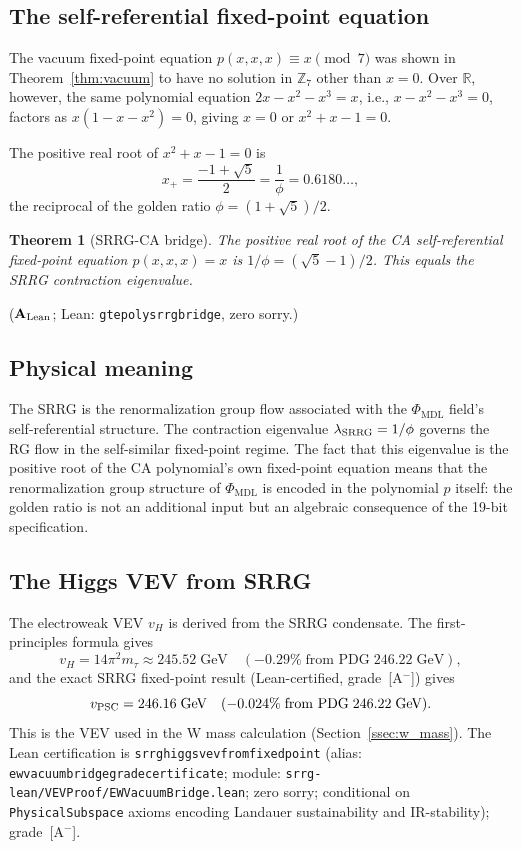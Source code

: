 \documentclass[11pt]{article}
\newtheorem{theorem}{Theorem}[section]
\theoremstyle{remark}
\newcommand{\PHIMDL}{\Phi_{\mathrm{MDL}}}
\newcommand{\ZS}{\mathbb{Z}_7}
\newcommand{\lean}[1]{%
  \penalty-100
  \begingroup\def\_{\textunderscore\allowbreak}\texttt{#1}\endgroup}
\newcommand{\CatAL}{\ensuremath{\textbf{A}_{\rm Lean}}}
\begin{document}
\subsection{The self-referential fixed-point equation}
\label{ssec:srrg_fp}

The vacuum fixed-point equation $p(x,x,x)\equiv x\pmod 7$ was shown in
Theorem~\ref{thm:vacuum} to have no solution in $\ZS$ other than $x=0$.
Over $\mathbb{R}$, however, the same polynomial equation
$2x - x^2 - x^3 = x$, i.e., $x - x^2 - x^3 = 0$, factors as
$x(1-x-x^2) = 0$, giving $x=0$ or $x^2+x-1=0$.

The positive real root of $x^2+x-1=0$ is
\[
  x_+ = \frac{-1+\sqrt{5}}{2} = \frac{1}{\phi} = 0.6180\ldots,
\]
the reciprocal of the golden ratio $\phi = (1+\sqrt{5})/2$.

\begin{theorem}[SRRG-CA bridge]
\label{thm:srrg}
The positive real root of the CA self-referential fixed-point equation
$p(x,x,x) = x$ is $1/\phi = (\sqrt{5}-1)/2$. This equals the SRRG contraction eigenvalue.
\end{theorem}

($\CatAL$; Lean: \lean{gte\_poly\_srrg\_bridge}, zero sorry.)

\subsection{Physical meaning}
\label{ssec:srrg_meaning}

The SRRG is the renormalization group flow associated with the $\PHIMDL$ field's
self-referential structure. The contraction eigenvalue $\lambda_{\rm SRRG} = 1/\phi$
governs the RG flow in the self-similar fixed-point regime. The fact that this
eigenvalue is the positive root of the CA polynomial's own fixed-point equation
means that the renormalization group structure of $\PHIMDL$ is encoded in the
polynomial $p$ itself: the golden ratio is not an additional input but an algebraic
consequence of the 19-bit specification.

\subsection{The Higgs VEV from SRRG}
\label{ssec:higgs_vev}

The electroweak VEV $v_H$ is derived from the SRRG condensate. The first-principles
formula gives
\[
  v_H = 14\pi^2 m_\tau \approx 245.52\;\text{GeV}
  \quad (-0.29\%\;\text{from PDG}\;246.22\;\text{GeV}),
\]
and the exact SRRG fixed-point result (Lean-certified, grade~[A$^-$]) gives
\[
  v_{\rm PSC} = 246.16\;\text{GeV} \quad (-0.024\%\;\text{from PDG}\;246.22\;\text{GeV}).
\]
This is the VEV used in the W mass calculation (Section~\ref{ssec:w_mass}).
The Lean certification is \lean{srrg\_higgs\_vev\_from\_fixed\_point}
(alias: \lean{ew\_vacuum\_bridge\_grade\_certificate};
module: \texttt{srrg-lean/VEVProof/EWVacuumBridge.lean}; zero sorry;
conditional on \texttt{PhysicalSubspace} axioms encoding Landauer sustainability
and IR-stability); grade~[A$^-$].
\end{document}

